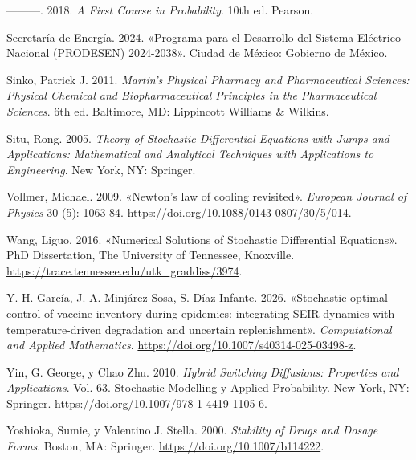 \documentclass[
  spanish,
  letterpaper,
  DIV=11,
  numbers=noendperiod]{scrreprt}
\newlength{\cslhangindent}
\newenvironment{CSLReferences}[2] %
 {\begin{list}{}{%
  \setlength{\itemindent}{0pt}
  \setlength{\leftmargin}{0pt}
  \setlength{\parsep}{0pt}
  \ifodd #1
   \setlength{\leftmargin}{\cslhangindent}
   \setlength{\itemindent}{-1\cslhangindent}
  \fi
  \setlength{\itemsep}{#2\baselineskip}}}
 {\end{list}}
\theoremstyle{plain}
\theoremstyle{plain}
\theoremstyle{plain}
\theoremstyle{definition}
\theoremstyle{remark}
\begin{document}
\begin{CSLReferences}{1}{0}
---------. 2018. \emph{A First Course in Probability}. 10th ed. Pearson.

Secretaría de Energía. 2024. {«Programa para el Desarrollo del Sistema
Eléctrico Nacional (PRODESEN) 2024-2038»}. Ciudad de México: Gobierno de
México.

Sinko, Patrick J. 2011. \emph{Martin's Physical Pharmacy and
Pharmaceutical Sciences: Physical Chemical and Biopharmaceutical
Principles in the Pharmaceutical Sciences}. 6th ed. Baltimore, MD:
Lippincott Williams \& Wilkins.

Situ, Rong. 2005. \emph{Theory of Stochastic Differential Equations with
Jumps and Applications: Mathematical and Analytical Techniques with
Applications to Engineering}. New York, NY: Springer.

Vollmer, Michael. 2009. {«Newton's law of cooling revisited»}.
\emph{European Journal of Physics} 30 (5): 1063-84.
\url{https://doi.org/10.1088/0143-0807/30/5/014}.

Wang, Liguo. 2016. {«Numerical Solutions of Stochastic Differential
Equations»}. PhD Dissertation, The University of Tennessee, Knoxville.
\url{https://trace.tennessee.edu/utk_graddiss/3974}.

Y. H. García, J. A. Minjárez-Sosa, S. Díaz-Infante. 2026. {«Stochastic
optimal control of vaccine inventory during epidemics: integrating
{SEIR} dynamics with temperature-driven degradation and uncertain
replenishment»}. \emph{Computational and Applied Mathematics}.
\url{https://doi.org/10.1007/s40314-025-03498-z}.

Yin, G. George, y Chao Zhu. 2010. \emph{Hybrid Switching Diffusions:
Properties and Applications}. Vol. 63. Stochastic Modelling y Applied
Probability. New York, NY: Springer.
\url{https://doi.org/10.1007/978-1-4419-1105-6}.

Yoshioka, Sumie, y Valentino J. Stella. 2000. \emph{Stability of Drugs
and Dosage Forms}. Boston, MA: Springer.
\url{https://doi.org/10.1007/b114222}.

\end{CSLReferences}
\end{document}
